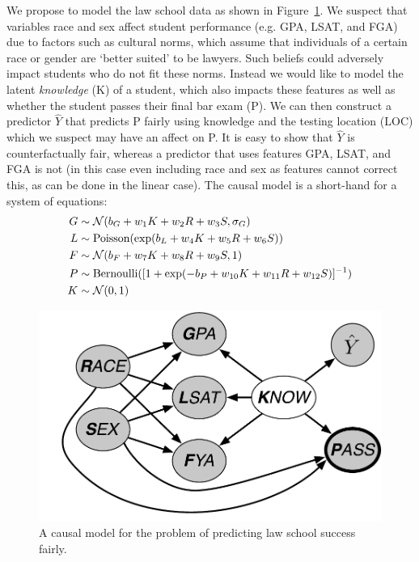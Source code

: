 We propose to model the law school data as shown in Figure~\ref{figure.law_school}. We suspect that variables race and sex affect student performance (e.g. GPA, LSAT, and FGA) due to factors such as cultural norms, which assume that individuals of a certain race or gender are `better suited' to be lawyers. Such beliefs could adversely impact students who do not fit these norms. Instead we would like to model the latent \emph{knowledge} (K) of a student, which also impacts these features as well as whether the student passes their final bar exam (P). We can then construct a predictor $\hat{Y}$ that predicts P fairly using knowledge and the testing location (LOC) which we suspect may have an affect on P. It is easy to show that $\hat{Y}$ is counterfactually fair, whereas a predictor that uses features GPA, LSAT, and FGA is not (in this case even including race and sex as features cannot correct this, as can be done in the linear case). The causal model is a short-hand for a system of equations:
\begin{align}
G &\sim {\cal N}(b_G + w_1 K + w_2 R + w_3 S, \sigma_G) \nonumber \\
L &\sim \textrm{Poisson}(\exp(b_L + w_4 K + w_5 R + w_6 S)) \nonumber \\
F &\sim {\cal N}(b_F + w_7 K + w_8 R + w_{9} S, 1) \nonumber \\
P &\sim \textrm{Bernoulli}([1+\exp(-b_P + w_{10} K + w_{11} R + w_{12} S)]^{-1}) \nonumber \\
K &\sim {\cal N}(0,1) \nonumber
\end{align}

 


\begin{figure}[th]
\begin{center}
\vspace{-1ex}
\centerline{\includegraphics[width=\columnwidth]{law_school_model}}
\vspace{-2ex}
\caption{A causal model for the problem of predicting law school success fairly.\label{figure.law_school}}
\vspace{-2ex}
\end{center}
\end{figure}


